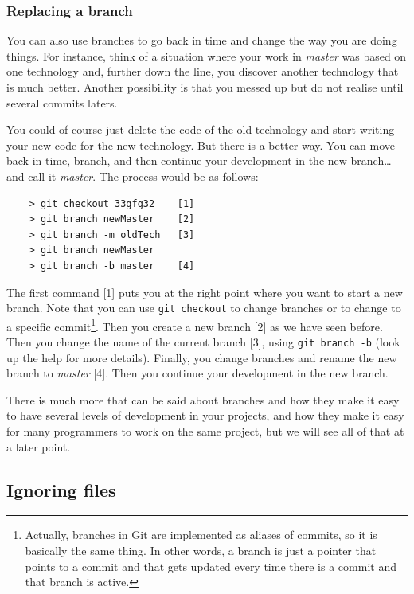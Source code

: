 \subsubsection*{Replacing a branch}
\label{sec:exercise-1ff}

You can also use branches to go back in time and change the way you
are doing things. For instance, think of a situation where your work
in \emph{master} was based on one technology and, further down the
line, you discover another technology that is much better. Another
possibility is that you messed up but do not realise until several
commits laters. 

You could of course just delete the code of the old technology and
start writing your new code for the new technology. But there is a
better way. You can move back in time, branch, and then continue your
development in the new branch\ldots and call it \emph{master}. The
process would be as follows: 

\begin{verbatim}
    > git checkout 33gfg32    [1]
    > git branch newMaster    [2]
    > git branch -m oldTech   [3]
    > git branch newMaster    
    > git branch -b master    [4]
\end{verbatim}

The first command [1] puts you at the right point where you want to
start a new branch. Note that you can use \verb+git checkout+ to
change branches or to change to a specific commit\footnote{Actually,
  branches in Git are implemented as aliases of commits, so it is
  basically the same thing. In other words, a branch is just a pointer
  that points to a commit and that gets updated every time there is a
  commit and that branch is active.}. Then you create a new branch [2]
as we have seen before. Then you change the name of the current
branch [3], using \verb+git branch -b+ (look up the help for more
details). Finally, you change branches and rename the new branch to
\emph{master} [4]. Then you continue your development in the new
branch. 

There is much more that can be said about branches and how they make
it easy to have several levels of development in your projects, and
how they make it easy for many programmers to work on the same
project, but we will see all of that at a later point. 

\subsection{Ignoring files}
\label{sec:ignoring-files}

